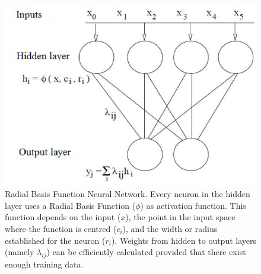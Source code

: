 \documentclass{article}
\begin{document}
\begin{figure}[!ht]
\includegraphics[width=120mm]{rnfbr.eps}
\caption{Radial Basis Function Neural Network. Every neuron in the hidden layer uses a Radial Basis Function ($\phi$) as activation function. This function depends on the input ($x$), the point in the input space where the function is centred ($c_i$), and the width or radius established for the neuron ($r_i$). Weights from hidden to output layers (namely $\lambda_{ij}$) can be efficiently calculated provided that there exist enough training data.}
\label{fig:rbfnn}
\end{figure}

\newpage
\clearpage
\end{document}
